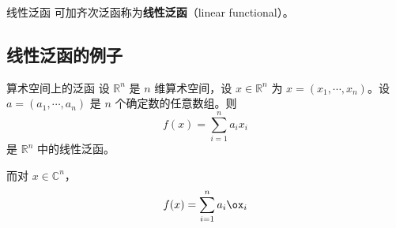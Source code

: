 \begin{definition}{线性泛函}
可加齐次泛函称为\textbf{线性泛函}（linear functional）。
\end{definition}


\subsection{线性泛函的例子}

\begin{example}{算术空间上的泛函}
设 $\mathbb R^n$ 是 $n$ 维算术空间，设 $x\in\mathbb R^n$ 为 $x=(x_1,\cdots,x_n)$。设 $a=(a_1,\cdots,a_n)$ 是 $n$ 个确定数的任意数组。则
\begin{equation}
f(x)=\sum_{i=1}^n a_ix_i
\end{equation}
是 $\mathbb R^n$ 中的线性泛函。

而对 $x\in\mathbb C^n$，
\begin{equation}
f(x)=\sum_{i=1}^n a_i\ox_i
\end{equation}


\end{example}








